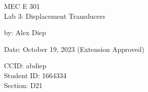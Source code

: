 \documentclass[letterpaper,12pt]{article} %
\renewcommand{\thesection}{Question \arabic{section}} %
\begin{document}
\begin{titlepage}
    \centering
    \vspace*{2cm} %
    
    \Huge {MEC E 301 \\Lab 3: Displacement Transducers} \\
    \vspace{1cm} %
    
    \Large by: Alex Diep \\
    \vspace{1cm} %

    \Large Date: October 19, 2023 (Extension Approved) \\ %
    \vspace{4cm} %

    \normalsize CCID: abdiep \\
    \normalsize Student ID: 1664334 \\ 
    \normalsize Section: D21 \\
    
    \vfill %
    
    
\end{titlepage}
\renewcommand\arraystretch{1.5}






% 
% 
% 


\newpage
\appendix
\renewcommand\thefigure{\thesection.\arabic{figure}}    
\renewcommand\thetable{\thesection.\arabic{table}}

\newpage
%

\newpage

\newpage

\newpage

\newpage

\end{document}
